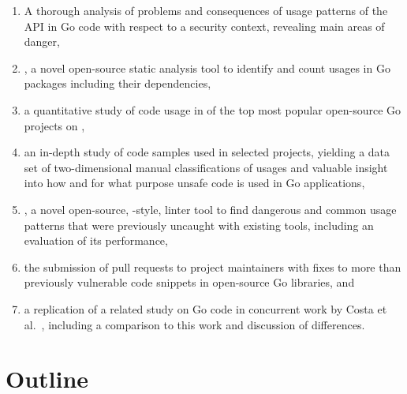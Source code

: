 \begin{enumerate}
    \item A thorough analysis of problems and consequences of usage patterns of the \unsafe{} \acrshort{API} in Go code
    with respect to a security context, revealing  main areas of danger,

    \item \toolGeiger, a novel open-source static analysis tool to identify and count \unsafe{} usages in Go packages
    including their dependencies,

    \item a quantitative study of \unsafe{} code usage in \projsAnalyzed{} of the top \projsTotal{} most popular
    open-source Go projects on \github{},

    \item an in-depth study of \numberLabeledCodeSnippets{} code samples used in \projsForLabeledCodeSnippets{} selected
    projects, yielding a data set of two-dimensional manual classifications of usages and valuable insight into how and
    for what purpose unsafe code is used in Go applications,

    \item \toolSafer{}, a novel open-source, \toolVet{}-style, linter tool to find  dangerous and common
    \unsafe{} usage patterns that were previously uncaught with existing tools, including an evaluation of its
    performance,

    \item the submission of \numberPRs{} pull requests to project maintainers with fixes to more than
    \numberBugsFixedRounded{} previously vulnerable code snippets in open-source Go libraries, and

    \item a replication of a related study on \unsafe{} Go code in concurrent work by Costa et al.~\cite{costa2020},
    including a comparison to this work and discussion of differences.
\end{enumerate}



\section{Outline}\label{sec:introduction:outline}

